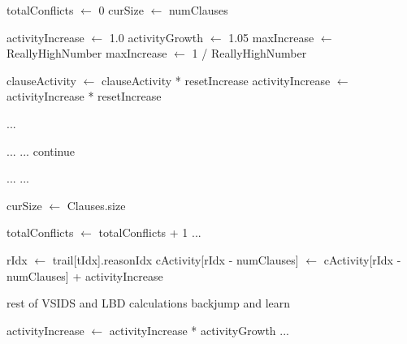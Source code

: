 \begin{algorithm}[H]
\caption{M-Size Learning Solver}\label{alg:46}
\begin{algorithmic}[1]

\State {}

\State totalConflicts $\gets$ 0
\State curSize $\gets$ numClauses

\State activityIncrease $\gets$ 1.0
\State activityGrowth $\gets$ 1.05
\State maxIncrease $\gets$ ReallyHighNumber
\State maxIncrease $\gets$ 1 / ReallyHighNumber

            \State clauseActivity $\gets$ clauseActivity * resetIncrease
        \EndFor
        \State activityIncrease $\gets$ activityIncrease * resetIncrease
    \EndIf

        \State ...
        
            \State ... 
                \State ... 
                \State {}
                \State {}
                \State {}
                \State continue
            \EndIf

            \State ... 
            \State {}
            \State {}
            \State {}
            \State ...

            \State {}
            \State {}
            \State {}
        \EndFor
        \State curSize $\gets$ Clauses.size
    \EndIf

    \State {}
    \State {}

        \State totalConflicts $\gets$ totalConflicts + 1
        \State ...

            \State rIdx $\gets$ trail[tIdx].reasonIdx 
                \State cActivity[rIdx - numClauses] $\gets$ cActivity[rIdx - numClauses] + activityIncrease
            \EndIf
        \EndFor

        \State rest of VSIDS and LBD calculations
        \State backjump and learn

        \State {}
        \State {}
        \State {}
        \State activityIncrease $\gets$ activityIncrease * activityGrowth
        \State ...
    \EndIf
\EndWhile

\EndProcedure
\end{algorithmic}
\end{algorithm}

